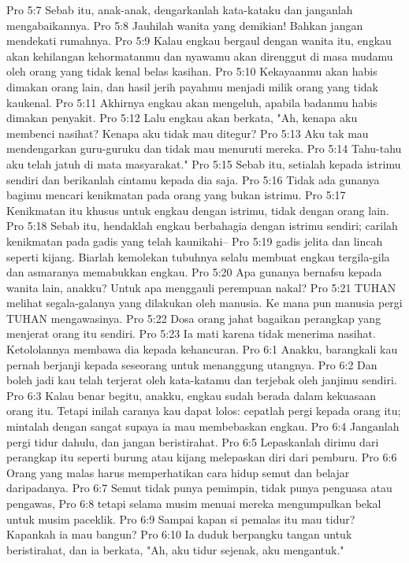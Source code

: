 Pro 5:7  Sebab itu, anak-anak, dengarkanlah kata-kataku dan janganlah mengabaikannya.
Pro 5:8  Jauhilah wanita yang demikian! Bahkan jangan mendekati rumahnya.
Pro 5:9  Kalau engkau bergaul dengan wanita itu, engkau akan kehilangan kehormatanmu dan nyawamu akan direnggut di masa mudamu oleh orang yang tidak kenal belas kasihan.
Pro 5:10  Kekayaanmu akan habis dimakan orang lain, dan hasil jerih payahmu menjadi milik orang yang tidak kaukenal.
Pro 5:11  Akhirnya engkau akan mengeluh, apabila badanmu habis dimakan penyakit.
Pro 5:12  Lalu engkau akan berkata, "Ah, kenapa aku membenci nasihat? Kenapa aku tidak mau ditegur?
Pro 5:13  Aku tak mau mendengarkan guru-guruku dan tidak mau menuruti mereka.
Pro 5:14  Tahu-tahu aku telah jatuh di mata masyarakat."
Pro 5:15  Sebab itu, setialah kepada istrimu sendiri dan berikanlah cintamu kepada dia saja.
Pro 5:16  Tidak ada gunanya bagimu mencari kenikmatan pada orang yang bukan istrimu.
Pro 5:17  Kenikmatan itu khusus untuk engkau dengan istrimu, tidak dengan orang lain.
Pro 5:18  Sebab itu, hendaklah engkau berbahagia dengan istrimu sendiri; carilah kenikmatan pada gadis yang telah kaunikahi--
Pro 5:19  gadis jelita dan lincah seperti kijang. Biarlah kemolekan tubuhnya selalu membuat engkau tergila-gila dan asmaranya memabukkan engkau.
Pro 5:20  Apa gunanya bernafsu kepada wanita lain, anakku? Untuk apa menggauli perempuan nakal?
Pro 5:21  TUHAN melihat segala-galanya yang dilakukan oleh manusia. Ke mana pun manusia pergi TUHAN mengawasinya.
Pro 5:22  Dosa orang jahat bagaikan perangkap yang menjerat orang itu sendiri.
Pro 5:23  Ia mati karena tidak menerima nasihat. Ketololannya membawa dia kepada kehancuran.
Pro 6:1  Anakku, barangkali kau pernah berjanji kepada seseorang untuk menanggung utangnya.
Pro 6:2  Dan boleh jadi kau telah terjerat oleh kata-katamu dan terjebak oleh janjimu sendiri.
Pro 6:3  Kalau benar begitu, anakku, engkau sudah berada dalam kekuasaan orang itu. Tetapi inilah caranya kau dapat lolos: cepatlah pergi kepada orang itu; mintalah dengan sangat supaya ia mau membebaskan engkau.
Pro 6:4  Janganlah pergi tidur dahulu, dan jangan beristirahat.
Pro 6:5  Lepaskanlah dirimu dari perangkap itu seperti burung atau kijang melepaskan diri dari pemburu.
Pro 6:6  Orang yang malas harus memperhatikan cara hidup semut dan belajar daripadanya.
Pro 6:7  Semut tidak punya pemimpin, tidak punya penguasa atau pengawas,
Pro 6:8  tetapi selama musim menuai mereka mengumpulkan bekal untuk musim paceklik.
Pro 6:9  Sampai kapan si pemalas itu mau tidur? Kapankah ia mau bangun?
Pro 6:10  Ia duduk berpangku tangan untuk beristirahat, dan ia berkata, "Ah, aku tidur sejenak, aku mengantuk."
